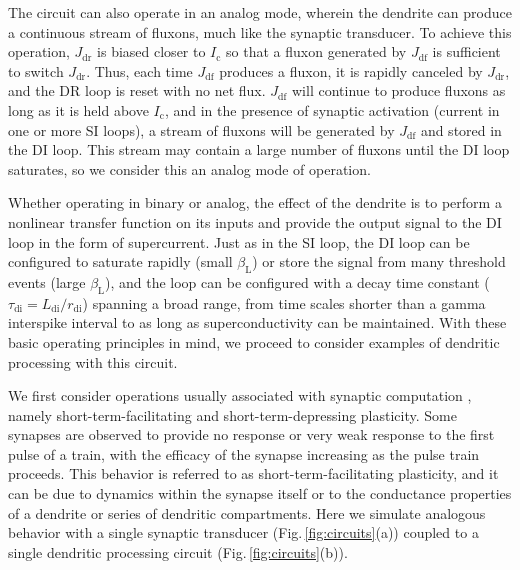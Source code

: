 \documentclass[twocolumn]{article}
\begin{document}
The circuit can also operate in an analog mode, wherein the dendrite can produce a continuous stream of fluxons, much like the synaptic transducer. To achieve this operation, $J_{\mathrm{dr}}$ is biased closer to $I_{\mathrm{c}}$ so that a fluxon generated by $J_{\mathrm{df}}$ is sufficient to switch $J_{\mathrm{dr}}$. Thus, each time $J_{\mathrm{df}}$ produces a fluxon, it is rapidly canceled by $J_{\mathrm{dr}}$, and the DR loop is reset with no net flux. $J_{\mathrm{df}}$ will continue to produce fluxons as long as it is held above $I_{\mathrm{c}}$, and in the presence of synaptic activation (current in one or more SI loops), a stream of fluxons will be generated by $J_{\mathrm{df}}$ and stored in the DI loop. This stream may contain a large number of fluxons until the DI loop saturates, so we consider this an analog mode of operation.

Whether operating in binary or analog, the effect of the dendrite is to perform a nonlinear transfer function on its inputs and provide the output signal to the DI loop in the form of supercurrent. Just as in the SI loop, the DI loop can be configured to saturate rapidly (small $\beta_{\mathrm{L}}$) or store the signal from many threshold events (large $\beta_{\mathrm{L}}$), and the loop can be configured with a decay time constant ($\tau_{\mathrm{di}} = L_{\mathrm{di}} / r_{\mathrm{di}}$) spanning a broad range, from time scales shorter than a gamma interspike interval to as long as superconductivity can be maintained. With these basic operating principles in mind, we proceed to consider examples of dendritic processing with this circuit.

We first consider operations usually associated with synaptic computation \cite{abre2004}, namely short-term-facilitating and short-term-depressing plasticity. Some synapses are observed to provide no response or very weak response to the first pulse of a train, with the efficacy of the synapse increasing as the pulse train proceeds. This behavior is referred to as short-term-facilitating plasticity, and it can be due to dynamics within the synapse itself or to the conductance properties of a dendrite or series of dendritic compartments. Here we simulate analogous behavior with a single synaptic transducer (Fig.\,\ref{fig:circuits}(a)) coupled to a single dendritic processing circuit (Fig.\,\ref{fig:circuits}(b)). 
\end{document}
